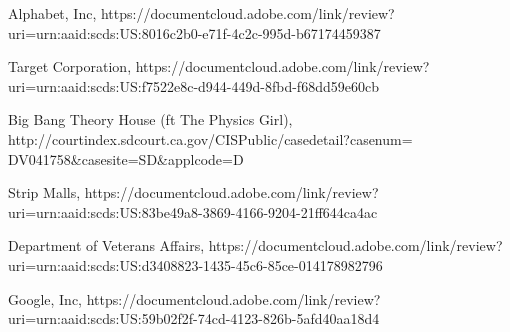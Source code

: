 \documentclass[a4paper]{arthur-letter}
\begin{document}
\begin{thebibliography}{}

Alphabet, Inc, https://documentcloud.adobe.com/link/review?uri=urn:aaid:scds:US:8016c2b0-e71f-4c2c-995d-b67174459387

Target Corporation, https://documentcloud.adobe.com/link/review?uri=urn:aaid:scds:US:f7522e8c-d944-449d-8fbd-f68dd59e60cb

Big Bang Theory House (ft The Physics Girl), http://courtindex.sdcourt.ca.gov/CISPublic/casedetail?casenum= DV041758\&casesite=SD\&applcode=D

Strip Malls, https://documentcloud.adobe.com/link/review?uri=urn:aaid:scds:US:83be49a8-3869-4166-9204-21ff644ca4ac

Department of Veterans Affairs, https://documentcloud.adobe.com/link/review?uri=urn:aaid:scds:US:d3408823-1435-45c6-85ce-014178982796

Google, Inc, https://documentcloud.adobe.com/link/review?uri=urn:aaid:scds:US:59b02f2f-74cd-4123-826b-5afd40aa18d4

\end{thebibliography}
\end{document}
